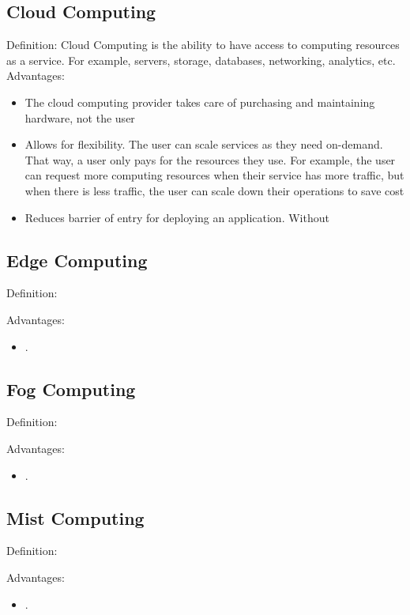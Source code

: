 \subsection{Cloud Computing}
Definition: Cloud Computing is the ability to have access to computing resources
as a service. For example, servers, storage, databases, networking, analytics,
etc. 
Advantages:
\begin{itemize}
  \item The cloud computing provider takes care of purchasing and maintaining
hardware, not the user
\item Allows for flexibility. The user can scale services as they need
  on-demand. That way, a user only pays for the resources they use. For example,
  the user can request more computing resources when their service has more
  traffic, but when there is less traffic, the user can scale down their
  operations to save cost
\item Reduces barrier of entry for deploying an application. Without 

\end{itemize}

\subsection{Edge Computing}
Definition: 


Advantages:
\begin{itemize}
  \item .
\end{itemize}

\subsection{Fog Computing}
Definition: 


Advantages:
\begin{itemize}
  \item .
\end{itemize}

\subsection{Mist Computing}
Definition: 

Advantages:
\begin{itemize}
  \item .
\end{itemize}

